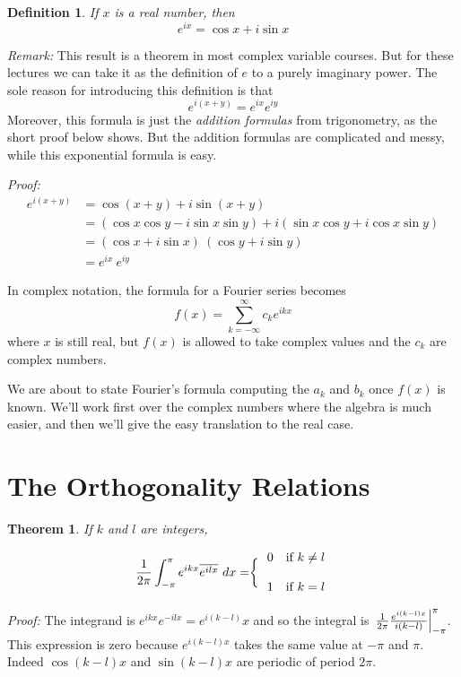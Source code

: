 \documentclass[11pt, oneside]{amsart}
\newtheorem{theorem}{Theorem}
\newtheorem{definition}{Definition}
\begin{document}
\begin{definition} If $x$ is a real number, then
$$e^{ix} = \cos x + i \sin x$$
\end{definition}

{\em Remark:} This result is a theorem in most complex variable courses. But for these lectures we can take it as the definition of $e$ to a purely imaginary power. The sole reason for introducing this definition is that
$$e^{i(x + y)} = e^{ix} e^{iy}$$
Moreover, this formula is just the {\em addition formulas} from trigonometry, as the short proof below shows. But the addition formulas are complicated and messy, while this exponential formula is easy.

{\em Proof:}
\begin{align*}
e^{i(x + y)} &= \cos(x + y) + i \sin (x + y) \\
&=  \left( \cos x \cos y - i \sin x \sin y \right) + i \left( \sin x \cos y + i \cos x \sin y \right) \\
&= \left( \cos x + i \sin x \right) \ \left( \cos y + i \sin y \right)\\
&= e^{ix} \ e^{iy}
\end{align*}

In complex notation, the formula for a Fourier series becomes
$$f(x) = \sum_{k = - \infty}^\infty c_k e^{ikx}$$
 where $x$ is still real, but $f(x)$ is allowed to take complex values and the $c_k$ are complex numbers.
 
 We are about to state Fourier's  formula computing the $a_k$ and $b_k$ once $f(x)$ is known.
 We'll work first over the complex numbers where the algebra is much easier, and then we'll give the easy translation to the real case.
 
 \section{The Orthogonality Relations}
 
 \begin{theorem} If $k$ and $l$ are integers,

$$\left. {1 \over {2 \pi}} \int_{- \pi}^\pi e^{ikx} \overline{e^{ilx}}\ dx = \right\{ \begin{array}{ll} 0 & \mbox{if $k \ne l$} \\ \\ 1 & \mbox{if $k = l$} \end{array}$$
\end{theorem} 

{\em Proof:} The integrand is $e^{ikx}e^{-ilx} = e^{i(k -l)}x$ and so  the integral is $\left.{1 \over {2 \pi}} {{e^{i(k -l)x}} \over {i(k -l)}} \right|_{-\pi}^\pi$. This expression is zero because $e^{i(k -l)x}$ takes the same value at $-\pi$ and $\pi$. Indeed $\cos (k - l) x$ and $\sin (k - l)x$ are periodic of period $2 \pi$.
\end{document}
